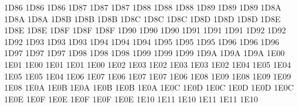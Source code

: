 \setcclcuc 1D86 1D86 1D86 %
\setcclcuc 1D87 1D87 1D87 %
\setcclcuc 1D88 1D88 1D88 %
\setcclcuc 1D89 1D89 1D89 %
\setcclcuc 1D8A 1D8A 1D8A %
\setcclcuc 1D8B 1D8B 1D8B %
\setcclcuc 1D8C 1D8C 1D8C %
\setcclcuc 1D8D 1D8D 1D8D %
\setcclcuc 1D8E 1D8E 1D8E %
\setcclcuc 1D8F 1D8F 1D8F %
\setcclcuc 1D90 1D90 1D90 %
\setcclcuc 1D91 1D91 1D91 %
\setcclcuc 1D92 1D92 1D92 %
\setcclcuc 1D93 1D93 1D93 %
\setcclcuc 1D94 1D94 1D94 %
\setcclcuc 1D95 1D95 1D95 %
\setcclcuc 1D96 1D96 1D96 %
\setcclcuc 1D97 1D97 1D97 %
\setcclcuc 1D98 1D98 1D98 %
\setcclcuc 1D99 1D99 1D99 %
\setcclcuc 1D9A 1D9A 1D9A %
\setcclcuc 1E00 1E01 1E00 %
\setcclcuc 1E01 1E01 1E00 %
\setcclcuc 1E02 1E03 1E02 %
\setcclcuc 1E03 1E03 1E02 %
\setcclcuc 1E04 1E05 1E04 %
\setcclcuc 1E05 1E05 1E04 %
\setcclcuc 1E06 1E07 1E06 %
\setcclcuc 1E07 1E07 1E06 %
\setcclcuc 1E08 1E09 1E08 %
\setcclcuc 1E09 1E09 1E08 %
\setcclcuc 1E0A 1E0B 1E0A %
\setcclcuc 1E0B 1E0B 1E0A %
\setcclcuc 1E0C 1E0D 1E0C %
\setcclcuc 1E0D 1E0D 1E0C %
\setcclcuc 1E0E 1E0F 1E0E %
\setcclcuc 1E0F 1E0F 1E0E %
\setcclcuc 1E10 1E11 1E10 %
\setcclcuc 1E11 1E11 1E10 %
